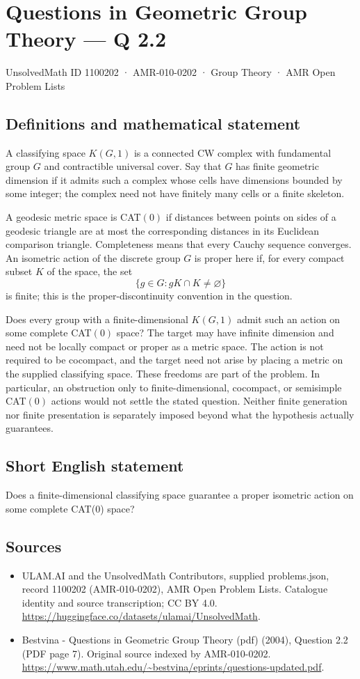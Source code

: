 \documentclass[11pt,a4paper]{article}
\begin{document}
\section*{Questions in Geometric Group Theory — Q 2.2}\label{1100202}
{\small UnsolvedMath ID 1100202 · AMR-010-0202 · Group Theory · AMR Open Problem Lists}
\subsection{Definitions and mathematical statement}
A classifying space $K(G,1)$ is a connected CW complex with fundamental group $G$ and contractible universal cover. Say that $G$ has finite geometric dimension if it admits such a complex whose cells have dimensions bounded by some integer; the complex need not have finitely many cells or a finite skeleton.

A geodesic metric space is CAT$(0)$ if distances between points on sides of a geodesic triangle are at most the corresponding distances in its Euclidean comparison triangle. Completeness means that every Cauchy sequence converges. An isometric action of the discrete group $G$ is proper here if, for every compact subset $K$ of the space, the set
\[
 \{g\in G:gK\cap K\ne\varnothing\}
\]
is finite; this is the proper-discontinuity convention in the question.

Does every group with a finite-dimensional $K(G,1)$ admit such an action on some complete CAT$(0)$ space? The target may have infinite dimension and need not be locally compact or proper as a metric space. The action is not required to be cocompact, and the target need not arise by placing a metric on the supplied classifying space. These freedoms are part of the problem. In particular, an obstruction only to finite-dimensional, cocompact, or semisimple CAT$(0)$ actions would not settle the stated question. Neither finite generation nor finite presentation is separately imposed beyond what the hypothesis actually guarantees.
\subsection{Short English statement}
Does a finite-dimensional classifying space guarantee a proper isometric action on some complete CAT(0) space?
\subsection{Sources}
\begin{itemize}
\item[S1] ULAM.AI and the UnsolvedMath Contributors, supplied problems.json, record 1100202 (AMR-010-0202), AMR Open Problem Lists. Catalogue identity and source transcription; CC BY 4.0.
\url{https://huggingface.co/datasets/ulamai/UnsolvedMath}.
\item[S2] Bestvina - Questions in Geometric Group Theory (pdf) (2004), Question 2.2 (PDF page 7). Original source indexed by AMR-010-0202.
\url{https://www.math.utah.edu/~bestvina/eprints/questions-updated.pdf}.
\end{itemize}
\end{document}
